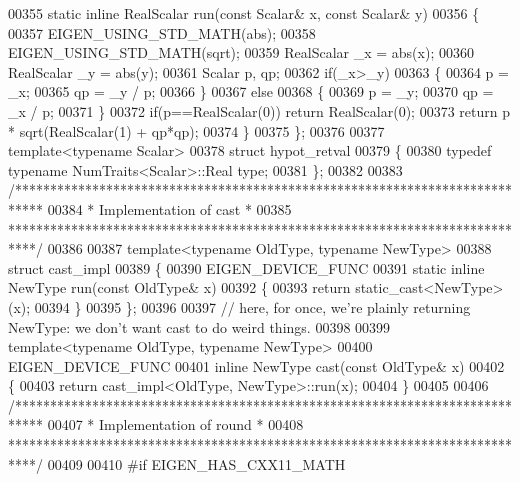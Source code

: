 \begin{DoxyCode}
00355   \textcolor{keyword}{static} \textcolor{keyword}{inline} RealScalar run(\textcolor{keyword}{const} Scalar& x, \textcolor{keyword}{const} Scalar& y)
00356   \{
00357     EIGEN\_USING\_STD\_MATH(abs);
00358     EIGEN\_USING\_STD\_MATH(sqrt);
00359     RealScalar \_x = abs(x);
00360     RealScalar \_y = abs(y);
00361     Scalar p, qp;
00362     \textcolor{keywordflow}{if}(\_x>\_y)
00363     \{
00364       p = \_x;
00365       qp = \_y / p;
00366     \}
00367     \textcolor{keywordflow}{else}
00368     \{
00369       p = \_y;
00370       qp = \_x / p;
00371     \}
00372     \textcolor{keywordflow}{if}(p==RealScalar(0)) \textcolor{keywordflow}{return} RealScalar(0);
00373     \textcolor{keywordflow}{return} p * sqrt(RealScalar(1) + qp*qp);
00374   \}
00375 \};
00376 
00377 \textcolor{keyword}{template}<\textcolor{keyword}{typename} Scalar>
00378 \textcolor{keyword}{struct }hypot\_retval
00379 \{
00380   \textcolor{keyword}{typedef} \textcolor{keyword}{typename} NumTraits<Scalar>::Real type;
00381 \};
00382 
00383 \textcolor{comment}{/****************************************************************************}
00384 \textcolor{comment}{* Implementation of cast                                                 *}
00385 \textcolor{comment}{****************************************************************************/}
00386 
00387 \textcolor{keyword}{template}<\textcolor{keyword}{typename} OldType, \textcolor{keyword}{typename} NewType>
00388 \textcolor{keyword}{struct }cast\_impl
00389 \{
00390   EIGEN\_DEVICE\_FUNC
00391   \textcolor{keyword}{static} \textcolor{keyword}{inline} NewType run(\textcolor{keyword}{const} OldType& x)
00392   \{
00393     \textcolor{keywordflow}{return} \textcolor{keyword}{static\_cast<}NewType\textcolor{keyword}{>}(x);
00394   \}
00395 \};
00396 
00397 \textcolor{comment}{// here, for once, we're plainly returning NewType: we don't want cast to do weird things.}
00398 
00399 \textcolor{keyword}{template}<\textcolor{keyword}{typename} OldType, \textcolor{keyword}{typename} NewType>
00400 EIGEN\_DEVICE\_FUNC
00401 \textcolor{keyword}{inline} NewType cast(\textcolor{keyword}{const} OldType& x)
00402 \{
00403   \textcolor{keywordflow}{return} cast\_impl<OldType, NewType>::run(x);
00404 \}
00405 
00406 \textcolor{comment}{/****************************************************************************}
00407 \textcolor{comment}{* Implementation of round                                                   *}
00408 \textcolor{comment}{****************************************************************************/}
00409 
00410 \textcolor{preprocessor}{#if EIGEN\_HAS\_CXX11\_MATH}

\end{DoxyCode}
